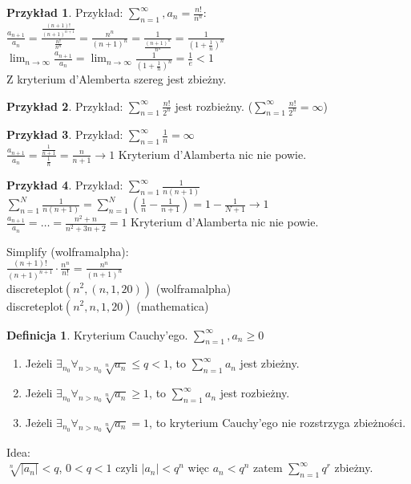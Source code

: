 \documentclass{article}
\theoremstyle{definition}
\newtheorem{de}{Definicja}[subsection]
\theoremstyle{definition}
\theoremstyle{definition}
\newtheorem{pk}{Przykład}[subsection]
\theoremstyle{definition}
\begin{document}
\begin{pk}
    Przykład: $\sum_{n=1}^{\infty}, a_n=\frac{n!}{n^n}$:\\
    $\frac{a_{n+1}}{a_n}=\frac{\frac{(n+1)!}{(n+1)^{n+1}}}{\frac{n!}{n^n}}=\frac{n^n}{(n+1)^n}=\frac{1}{\frac{(n+1)^n}{n^n}}=\frac{1}{(1+\frac{1}{n})^n}$\\
    $\lim_{n\rightarrow \infty} \frac{a_{n+1}}{a_n} = \lim_{n\rightarrow\infty} \frac{1}{(1+\frac{1}{n})^n}=\frac{1}{e}<1$\\
    Z kryterium d'Alemberta szereg jest zbieżny.
\end{pk}

\begin{pk}
    Przykład: $\sum_{n=1}^{\infty} \frac{n!}{2^n}$ jest rozbieżny. ($\sum_{n=1}^{\infty} \frac{n!}{2^n}=\infty$)
\end{pk}

\begin{pk}
    Przykład:
    $\sum_{n=1}^{\infty} \frac{1}{n} = \infty$\\
    $\frac{a_{n+1}}{a_n} = \frac{\frac{1}{n+1}}{\frac{1}{n}}=\frac{n}{n+1}\rightarrow 1$ Kryterium d'Alamberta nic nie powie.
\end{pk}

\begin{pk}
    Przykład: $\sum_{n=1}^{\infty} \frac{1}{n(n+1)}$\\
    $\sum_{n=1}^{N} \frac{1}{n(n+1)} = \sum_{n=1}^{N} (\frac{1}{n}-\frac{1}{n+1})=1-\frac{1}{N+1}\rightarrow 1$\\
    $\frac{a_{n+1}}{a_n} = \dots = \frac{n^2+n}{n^2+3n+2}=1$ Kryterium d'Alamberta nic nie powie.
\end{pk}

Simplify (wolframalpha):\\
$\frac{(n+1)!}{(n+1)^{n+1}}\cdot\frac{n^n}{n!}=\frac{n^n}{(n+1)^n}$\\

discreteplot$(n^2,(n,1,20))$ (wolframalpha)\\

discreteplot$(n^2,{n,1,20})$ (mathematica)

\begin{de}
    Kryterium Cauchy'ego. $\sum_{n=1}^{\infty}, a_n\geq 0$
    \begin{enumerate}
        \item Jeżeli $\exists_{n_0}\forall_{n>n_0} \sqrt[n]{a_n} \leq q < 1$, to $\sum_{n=1}^{\infty} a_n$ jest zbieżny.
        \item Jeżeli $\exists_{n_0}\forall_{n>n_0} \sqrt[n]{a_n} \geq 1$, to $\sum_{n=1}^{\infty} a_n$ jest rozbieżny.
        \item Jeżeli $\exists_{n_0}\forall_{n>n_0} \sqrt[n]{a_n} = 1$, to kryterium Cauchy'ego nie rozstrzyga zbieżności.
    \end{enumerate}
    Idea:\\
    $\sqrt[n]{|a_n|}<q$, $0<q<1$ czyli
    $|a_n|<q^n$ więc
    $a_n<q^n$ zatem
    $\sum_{n=1}^{\infty} q^r$ zbieżny.
\end{de}
\end{document}
